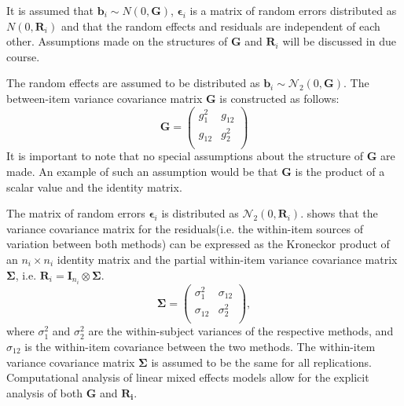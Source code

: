 \documentclass[12pt, a4paper]{report}
\theoremstyle{plain}
\theoremstyle{definition}
\theoremstyle{remark}
\begin{document}
		\bigskip
				It is assumed that $\boldsymbol{b}_i \sim N(0,\boldsymbol{G})$,
				$\boldsymbol{\epsilon}_i$ is a matrix of random errors distributed as $N(0,\boldsymbol{R}_i)$ and
				that the random effects and residuals are independent of each other. Assumptions made on the structures of $\boldsymbol{G}$ and $\boldsymbol{R}_i$ will be discussed in due course.
				
				\bigskip
		
		The random effects are assumed to be distributed as $\boldsymbol{b}_i \sim \mathcal{N}_2(0,\boldsymbol{G})$. The between-item variance covariance matrix $\boldsymbol{G}$ is constructed as follows:
		\[ \boldsymbol{G} =\left(
		\begin{array}{cc}
		g^2_1  & g_{12} \\
		g_{12} & g^2_2 \\
		\end{array}
		\right) \]
		It is important to note that no special assumptions about the structure of $\boldsymbol{G}$ are made. An example of such an assumption would be that $\boldsymbol{G}$ is the product of a scalar value and the identity matrix.
		
		
		The matrix of random errors $\boldsymbol{\epsilon}_i$ is distributed as $\mathcal{N}_2(0,\boldsymbol{R}_i)$.
		\citet{hamlett} shows that the variance covariance matrix for the residuals(i.e. the within-item sources of variation between both methods) can be expressed as the Kroneckor product of an $n_i \times n_i$ identity matrix and the partial within-item variance covariance matrix $\boldsymbol{\Sigma}$, i.e. $\boldsymbol{R}_{i} = \boldsymbol{I}_{n_{i}} \otimes \boldsymbol{\Sigma}$.
		\[
		\boldsymbol{\Sigma} = \left( \begin{array}{cc}
		\sigma^2_{1} & \sigma_{12} \\
		\sigma_{12} & \sigma^2_{2} \\
		\end{array}\right),
		\]
		where $\sigma^2_{1}$ and $\sigma^2_{2}$ are the within-subject variances of the respective methods, and $\sigma_{12}$ is the within-item covariance between the two methods. The within-item variance covariance matrix $\boldsymbol{\Sigma}$ is assumed to be the same for all replications. Computational analysis of linear mixed effects models allow for the explicit analysis of both $\boldsymbol{G}$ and $\boldsymbol{R_i}$. 
		
\end{document}

